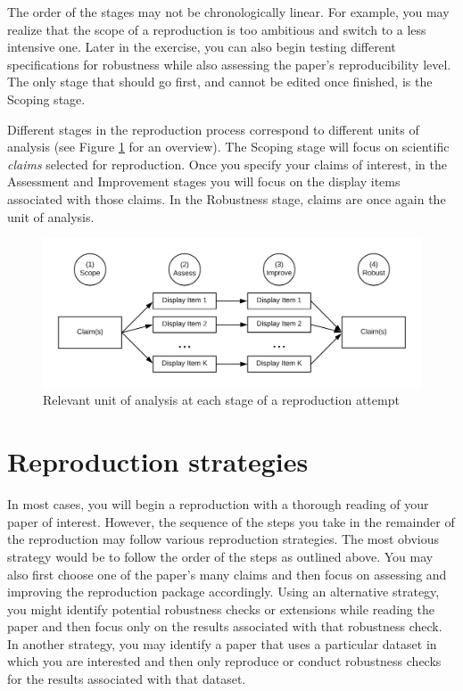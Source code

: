 \documentclass[
  openany]{book}
\begin{document}
The order of the stages may not be chronologically linear. For example, you may realize that the scope of a reproduction is too ambitious and switch to a less intensive one. Later in the exercise, you can also begin testing different specifications for robustness while also assessing the paper's reproducibility level. The only stage that should go first, and cannot be edited once finished, is the Scoping stage.

Different stages in the reproduction process correspond to different units of analysis (see Figure \ref{fig:stages-unit} for an overview). The Scoping stage will focus on scientific \emph{claims} selected for reproduction. Once you specify your claims of interest, in the Assessment and Improvement stages you will focus on the display items associated with those claims. In the Robustness stage, claims are once again the unit of analysis.

\begin{figure}
\includegraphics[width=1\linewidth]{unit-of-analysis} \caption{Relevant unit of analysis at each stage of a reproduction attempt}\label{fig:stages-unit}
\end{figure}

\hypertarget{reproduction-strategies}{%
\section*{Reproduction strategies}\label{reproduction-strategies}}

In most cases, you will begin a reproduction with a thorough reading of your paper of interest. However, the sequence of the steps you take in the remainder of the reproduction may follow various reproduction strategies. The most obvious strategy would be to follow the order of the steps as outlined above. You may also first choose one of the paper's many claims and then focus on assessing and improving the reproduction package accordingly. Using an alternative strategy, you might identify potential robustness checks or extensions while reading the paper and then focus only on the results associated with that robustness check. In another strategy, you may identify a paper that uses a particular dataset in which you are interested and then only reproduce or conduct robustness checks for the results associated with that dataset.
\end{document}
